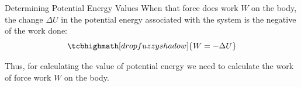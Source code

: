 \documentclass[18pt]{LectMechanics}
\begin{document}
\begin{frame}{Determining Potential Energy Values}{}
	When that force does work $W$ on the body, the change $\Delta U$ in
	the potential energy associated with the system is the negative of the work done:
	\begin{equation*}
		\tcbhighmath[drop fuzzy shadow]{W = -\Delta U}
	\end{equation*}

	\begin{boxedframe}
		Thus, for calculating the value of potential energy we need to calculate the work of force work $W$ on the body.
	\end{boxedframe}

\end{frame}
\end{document}
